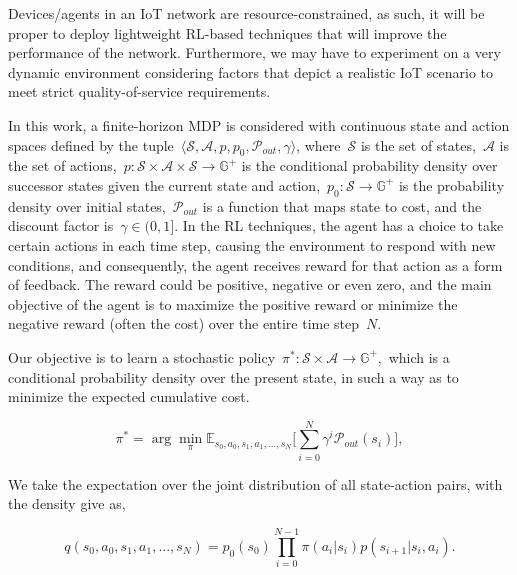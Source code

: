 \documentclass[journal]{IEEEtran}
\begin{document}
Devices/agents in an IoT network are resource-constrained, as such, it will be proper to deploy lightweight RL-based techniques that will improve the performance of the network. Furthermore, we may have to experiment on a very dynamic environment considering factors that depict a realistic IoT scenario to meet strict quality-of-service requirements.

In this work, a finite-horizon MDP is considered with continuous state and action spaces defined by the tuple~$\langle \mathcal{S}, \mathcal{A}, p, p_0, \mathcal{P}_{out}, \gamma \rangle$, where~$\mathcal{S}$ is the set of states,~$\mathcal{A}$ is the set of actions,~$p: \mathcal{S}\times \mathcal{A} \times \mathcal{S} \rightarrow \mathbb{G}^+$ is the conditional probability density over successor states given the current state and action,~$p_0: \mathcal{S} \rightarrow \mathbb{G}^+ $ is the probability density over initial states,~$\mathcal{P}_{out}$ is a function that maps state to cost, and the discount factor is~$\gamma \in (0,1]$.
In the RL techniques, the agent has a choice to take certain actions in each time step, causing the environment to respond with new conditions, and consequently, the agent receives reward for that action as a form of feedback. The reward could be positive, negative or even zero, and the main objective of the agent is to maximize the positive reward or minimize the negative reward (often the cost) over the entire time step~$N$.

Our objective is to learn a stochastic policy~$\pi^*: \mathcal{S}\times \mathcal{A}\rightarrow \mathbb{G}^+,$ which is a conditional probability density over the present state, in such a way as to minimize the expected cumulative cost.


\begin{equation}\label{eqn4}
\pi^* = \arg \min_{\pi} \mathbb{E}_{s_0, a_0, s_1, a_1, ..., s_N} \Big[ \sum_{i=0}^{N} \gamma^i \mathcal{P}_{out}(s_i) \Big],
\end{equation}

We take the expectation over the joint distribution of all state-action pairs, with the density give as,

\begin{equation}\label{eqn5}
q(s_0, a_0, s_1, a_1, ..., s_N) = p_0(s_0) \prod_{i=0}^{N-1} \pi(a_i|s_i) p(s_{i+1}|s_i, a_i).
\end{equation}
\end{document}
